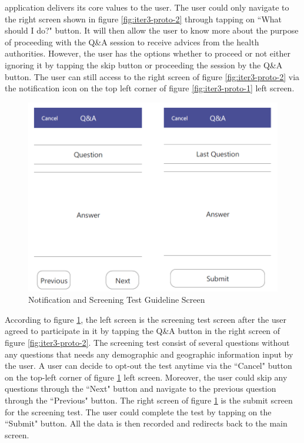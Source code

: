 \begin{enumerate}[a)]
          application delivers its core values to the user. The user could only navigate to the right screen shown
          in figure \ref{fig:iter3-proto-2} through tapping on ``What should I do?" button. It will then allow the user to know more
          about the purpose of proceeding with the Q\&A session to receive advices from the health authorities.
          However, the user has the options whether to proceed or not either ignoring it by tapping the skip
          button or proceeding the session by the Q\&A button. The user can still access to the right screen of
          figure \ref{fig:iter3-proto-2} via the notification icon on the top left corner of figure \ref{fig:iter3-proto-1} left screen.
          \begin{figure}[H]
            \centering
            \includegraphics[scale=1]{img/prototype/iter3-proto-3.png}
            \caption{Notification and Screening Test Guideline Screen}
            \label{fig:iter3-proto-3}
          \end{figure}
          According to figure \ref{fig:iter3-proto-3}, the left screen is the screening test screen after the user agreed to participate in it by tapping the Q\&A button in the right screen of figure \ref{fig:iter3-proto-2}. The screening test consist of several questions without any questions that needs any demographic and geographic information input by the user. A user can decide to opt-out the test anytime via the ``Cancel" button on the top-left corner of figure \ref{fig:iter3-proto-3} left screen. Moreover, the user could skip any questions through the ``Next" button and navigate to the previous question through the ``Previous" button. The right screen of figure \ref{fig:iter3-proto-3} is the submit screen for the screening test. The user could complete the test by tapping on the ``Submit" button. All the data is then recorded and redirects back to the main screen.

\end{enumerate}
